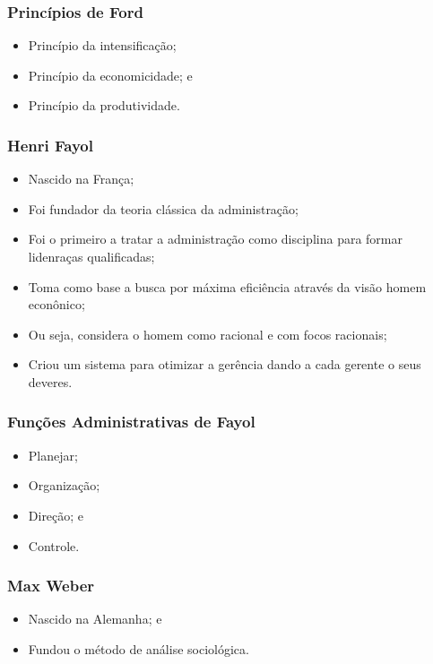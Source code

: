 \documentclass[aspectratio=169]{beamer}
\begin{document}
\begin{frame}
	\frametitle{Princípios de Ford }

	\begin{itemize}
		\item Princípio da intensifica\c cão;
		\item Princípio da economicidade; e
		\item Princípio da produtividade.
	\end{itemize}
\end{frame}

\begin{frame}
	\frametitle{Henri Fayol}

	\begin{itemize}
		\item Nascido na Fran\c ca;
		\item Foi fundador da teoria clássica da administra\c cão;
		\item Foi o primeiro a tratar a administra\c cão como disciplina para formar lidenra\c cas qualificadas;
		\item Toma como base a busca por máxima eficiência através da visão homem econônico;
		\item Ou seja, considera o homem como racional e com focos racionais;
		\item Criou um sistema para otimizar a gerência dando a cada gerente o seus deveres.
	\end{itemize}
\end{frame}

\begin{frame}
	\frametitle{Fun\c cões Administrativas de Fayol}

	\begin{itemize}
		\item Planejar;
		\item Organiza\c cão;
		\item Dire\c cão; e
		\item Controle.
	\end{itemize}
\end{frame}

\begin{frame}
	\frametitle{Max Weber}

	\begin{itemize}
		\item Nascido na Alemanha; e
		\item Fundou o método de análise sociológica.
	\end{itemize}
\end{frame}
\end{document}

